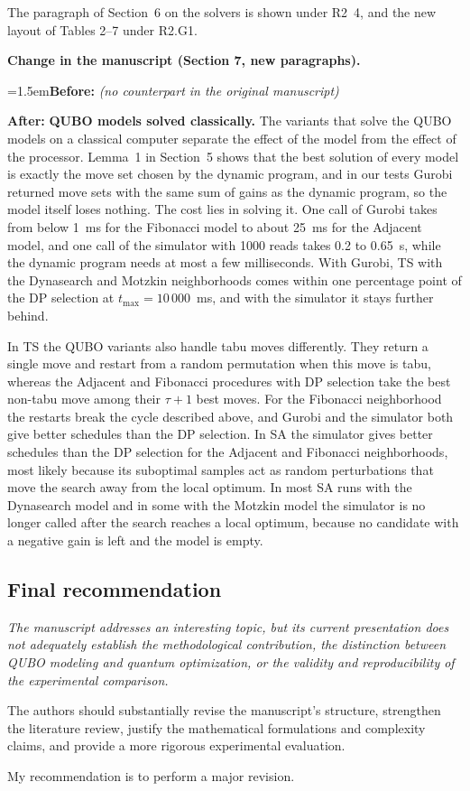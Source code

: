 \documentclass[12pt]{article}
\newenvironment{lead}{\par\medskip\noindent\itshape\renewcommand{\emph}[1]{\textbf{##1}}\ignorespaces}{\par}
\newcommand{\change}[3]{\par\smallskip\noindent\textbf{Change in the manuscript (#1).}\par
  {\leftskip=1.5em\noindent\textbf{Before:} #2\par\noindent\textbf{After:} #3\par}}
\begin{document}
The paragraph of Section~6 on the solvers is shown under R2~4, and the new layout of Tables 2--7 under R2.G1.
\change{Section 7, new paragraphs}{\textit{(no counterpart in the original manuscript)}}{\textbf{QUBO models solved classically.} The variants that solve the QUBO models on a classical computer separate the effect of the model from the effect of the processor. Lemma~1 in Section~5 shows that the best solution of every model is exactly the move set chosen by the dynamic program, and in our tests Gurobi returned move sets with the same sum of gains as the dynamic program, so the model itself loses nothing. The cost lies in solving it. One call of Gurobi takes from below 1~ms for the Fibonacci model to about 25~ms for the Adjacent model, and one call of the simulator with 1000 reads takes 0.2 to 0.65~s, while the dynamic program needs at most a few milliseconds. With Gurobi, TS with the Dynasearch and Motzkin neighborhoods comes within one percentage point of the DP selection at $t_{\max}=10\,000$~ms, and with the simulator it stays further behind.

In TS the QUBO variants also handle tabu moves differently. They return a single move and restart from a random permutation when this move is tabu, whereas the Adjacent and Fibonacci procedures with DP selection take the best non-tabu move among their $\tau+1$ best moves. For the Fibonacci neighborhood the restarts break the cycle described above, and Gurobi and the simulator both give better schedules than the DP selection. In SA the simulator gives better schedules than the DP selection for the Adjacent and Fibonacci neighborhoods, most likely because its suboptimal samples act as random perturbations that move the search away from the local optimum. In most SA runs with the Dynasearch model and in some with the Motzkin model the simulator is no longer called after the search reaches a local optimum, because no candidate with a negative gain is left and the model is empty.}

\subsection*{Final recommendation}

\begin{lead}
The manuscript addresses an interesting topic, but its current presentation does not adequately establish the methodological contribution, the distinction between QUBO modeling and quantum optimization, or the validity and reproducibility of the experimental comparison.

The authors should substantially revise the manuscript's structure, strengthen the literature review, justify the mathematical formulations and complexity claims, and provide a more rigorous experimental evaluation.

My recommendation is to perform a major revision.
\end{lead}
\end{document}
